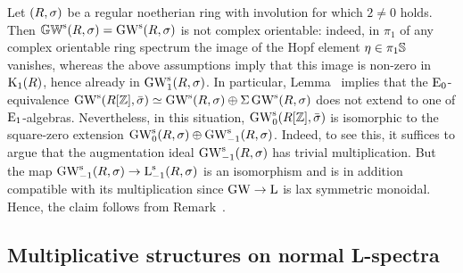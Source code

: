 \begin{remark}
Let $(R,\sigma)$ be a regular noetherian ring with involution for which $2 \neq 0$ holds. Then $\mathbb{GW}^{\mathrm{s}}(R,\sigma) = \operatorname{GW}^{\mathrm{s}}(R,\sigma)$ is not complex orientable: indeed, in $\pi_1$ of any complex orientable ring spectrum the image of the Hopf element $\eta \in \pi_1\mathbb{S}$ vanishes, whereas 
the above assumptions %
imply that this image is non-zero in $\operatorname K_1(R)$, hence already in $\operatorname{GW}_1^{\mathrm{s}}(R,\sigma)$.
In particular, Lemma~ implies that the ${\mathrm{E}_{0}}$-equivalence $\operatorname{GW}^{\mathrm{s}}(R[\mathbb{Z}],\bar{\sigma}) \simeq \operatorname{GW}^{\mathrm{s}}(R,\sigma) \oplus \Sigma\operatorname{GW}^{\mathrm{s}}(R,\sigma)$ does not extend to one of ${\mathrm{E}_{1}}$-algebras. Nevertheless, in this situation,
$\operatorname{GW}_0^{\mathrm{s}}(R[\mathbb{Z}],\bar{\sigma})$ is isomorphic to the square-zero extension $\operatorname{GW}_0^{\mathrm{s}}(R,\sigma) \oplus \operatorname{GW}_{-1}^{\mathrm{s}}(R,\sigma)$. Indeed, to see this, it suffices to argue that the augmentation ideal $\operatorname{GW}_{-1}^{\mathrm{s}}(R,\sigma)$ has trivial multiplication. But the map $\operatorname{GW}_{-1}^{\mathrm{s}}(R,\sigma) \to \operatorname L_{-1}^{\mathrm{s}}(R,\sigma)$ is an isomorphism and is in addition compatible with its multiplication since $\operatorname{GW} \to \operatorname L$ is lax symmetric monoidal. Hence, the claim follows from Remark~. 
\end{remark}















\subsection{Multiplicative structures on normal L-spectra}
\label{subsection:normal-L}%

